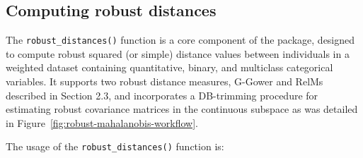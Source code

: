\subsection{Computing robust distances}

The \texttt{robust\_distances()} function is a core component of the  package, designed to compute robust squared (or simple) distance values between individuals in a weighted dataset containing quantitative, binary, and multiclass categorical variables. It supports two robust distance measures, G-Gower and RelMs described in Section 2.3,
and incorporates a DB-trimming procedure for estimating robust covariance matrices in the continuous subspace as was detailed in Figure~\ref{fig:robust-mahalanobis-workflow}.

The usage of the \texttt{robust\_distances()} function is:


